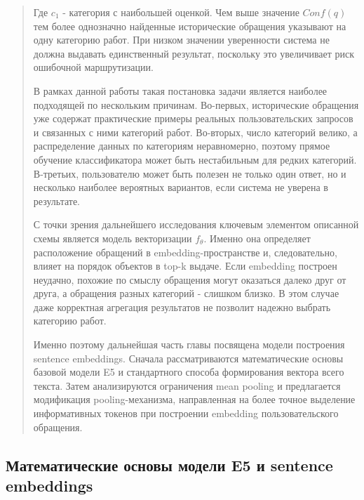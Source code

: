 \begin{quote}
Где \(c_{1}\) - категория с наибольшей оценкой. Чем выше значение
\(Conf(q)\) тем более однозначно найденные исторические обращения
указывают на одну категорию работ. При низком значении уверенности
система не должна выдавать единственный результат, поскольку это
увеличивает риск ошибочной маршрутизации.

В рамках данной работы такая постановка задачи является наиболее
подходящей по нескольким причинам. Во-первых, исторические обращения уже
содержат практические примеры реальных пользовательских запросов и
связанных с ними категорий работ. Во-вторых, число категорий велико, а
распределение данных по категориям неравномерно, поэтому прямое обучение
классификатора может быть нестабильным для редких категорий. В-третьих,
пользователю может быть полезен не только один ответ, но и несколько
наиболее вероятных вариантов, если система не уверена в результате.

С точки зрения дальнейшего исследования ключевым элементом описанной
схемы является модель векторизации \(f_{\theta}\). Именно она определяет
расположение обращений в embedding-пространстве и, следовательно, влияет
на порядок объектов в top-k выдаче. Если embedding построен неудачно,
похожие по смыслу обращения могут оказаться далеко друг от друга, а
обращения разных категорий - слишком близко. В этом случае даже
корректная агрегация результатов не позволит надежно выбрать категорию
работ.

Именно поэтому дальнейшая часть главы посвящена модели построения
sentence embeddings. Сначала рассматриваются математические основы
базовой модели E5 и стандартного способа формирования вектора всего
текста. Затем анализируются ограничения mean pooling и предлагается
модификация pooling-механизма, направленная на более точное выделение
информативных токенов при построении embedding пользовательского
обращения.
\end{quote}

\hypertarget{ux43cux430ux442ux435ux43cux430ux442ux438ux447ux435ux441ux43aux438ux435-ux43eux441ux43dux43eux432ux44b-ux43cux43eux434ux435ux43bux438-e5-ux438-sentence-embeddings}{%
\subsection{\texorpdfstring{Математические основы модели E5 и sentence
embeddings\\
}{Математические основы модели E5 и sentence embeddings }}\label{ux43cux430ux442ux435ux43cux430ux442ux438ux447ux435ux441ux43aux438ux435-ux43eux441ux43dux43eux432ux44b-ux43cux43eux434ux435ux43bux438-e5-ux438-sentence-embeddings}}

